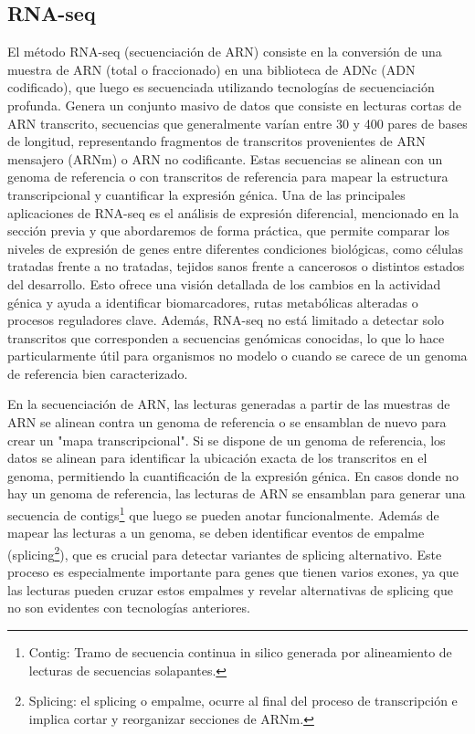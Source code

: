 \subsection{RNA-seq}

El método RNA-seq (secuenciación de ARN) consiste en la conversión de una muestra de ARN (total o fraccionado) en una biblioteca de ADNc 
(ADN codificado), que luego es secuenciada utilizando tecnologías de secuenciación profunda. Genera un conjunto masivo de datos que consiste 
en lecturas cortas de ARN transcrito, secuencias que generalmente varían entre 30 y 400 pares de bases de longitud, representando fragmentos 
de transcritos provenientes de ARN mensajero (ARNm) o ARN no codificante. Estas secuencias se alinean con un genoma de referencia o con 
transcritos de referencia para mapear la estructura transcripcional y cuantificar la expresión génica. Una de las principales aplicaciones 
de RNA-seq es el análisis de expresión diferencial, mencionado en la sección previa y que abordaremos de forma práctica, que permite comparar 
los niveles de expresión de genes entre diferentes condiciones 
biológicas, como células tratadas frente a no tratadas, tejidos sanos frente a cancerosos o distintos estados del desarrollo. Esto ofrece 
una visión detallada de los cambios en la actividad génica y ayuda a identificar biomarcadores, rutas metabólicas alteradas o procesos 
reguladores clave. Además, RNA-seq no está limitado a detectar solo transcritos que corresponden a secuencias genómicas conocidas, 
lo que lo hace particularmente útil para organismos no modelo o cuando se carece de un genoma de referencia bien caracterizado. \newline

En la secuenciación de ARN, las lecturas generadas a partir de las muestras de ARN se alinean contra un genoma de referencia o se ensamblan de
nuevo para crear un "mapa transcripcional". Si se dispone de un genoma de referencia, los datos se alinean para identificar la ubicación exacta de
los transcritos en el genoma, permitiendo la cuantificación de la expresión génica. En casos donde no hay un genoma de referencia, las lecturas 
de ARN se ensamblan para generar una secuencia de contigs\footnote[3]{Contig: Tramo de secuencia continua in silico generada por alineamiento 
de lecturas de secuencias solapantes.} que luego se pueden anotar funcionalmente. Además de mapear las lecturas a un genoma, 
se deben identificar eventos de empalme (splicing\footnote[4]{Splicing: el splicing o empalme, ocurre al final del proceso de transcripción e 
implica cortar y reorganizar secciones de ARNm.}), que es crucial para detectar variantes de splicing alternativo. Este proceso es especialmente 
importante para genes que tienen varios exones, ya que las lecturas pueden cruzar estos empalmes y revelar alternativas de splicing que no son 
evidentes con tecnologías anteriores. \newline %

